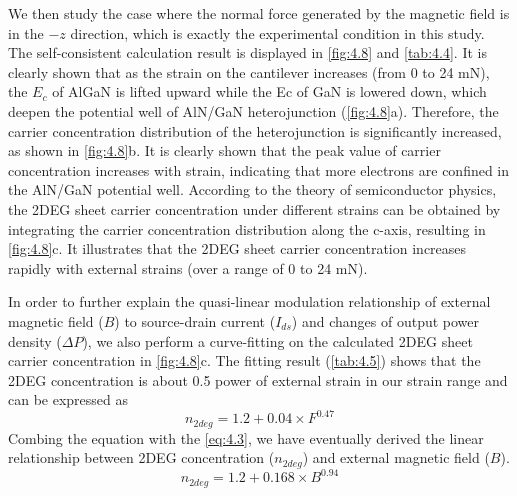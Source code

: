 We  then study the case where the normal force generated by the  magnetic field is in the $-z$ direction, which is exactly the experimental condition in this study. The self-consistent calculation result is displayed in \autoref{fig:4.8} and \autoref{tab:4.4}. It is clearly shown that as the strain on the cantilever  increases (from 0 to 24 \unit{\mN}), the $E_{c}$ of AlGaN is lifted upward while the Ec of GaN is lowered down, which deepen the  potential well of AlN/GaN heterojunction (\autoref{fig:4.8}a). Therefore, the  carrier  concentration distribution of the heterojunction is significantly increased, as shown in \autoref{fig:4.8}b. It is clearly shown that the peak value of carrier concentration increases with strain, indicating that more electrons are confined in the AlN/GaN potential well. According to the theory of semiconductor physics, the 2DEG sheet carrier concentration under different strains can be obtained by integrating the carrier concentration distribution along the c-axis, resulting in \autoref{fig:4.8}c. It illustrates that the 2DEG  sheet carrier concentration increases rapidly with external strains (over a range of 0 to 24 \unit{\mN}).

In order to further explain the quasi-linear modulation relationship of external magnetic field ($B$) to source-drain current ($I_{ds}$) and changes of output power density ($\Delta P$), we also perform a curve-fitting on the calculated 2DEG sheet carrier  concentration in \autoref{fig:4.8}c. The fitting result (\autoref{tab:4.5}) shows that the 2DEG concentration is about 0.5 power of external strain in our strain range and can be expressed as
\begin{equation}
	n_{2deg}=1.2+0.04 \times F^{0.47}
\label{eq:4.}
\end{equation}
Combing the equation with the \autoref{eq:4.3}, we have eventually derived the linear relationship between 2DEG concentration ($n_{2deg}$) and external magnetic field ($B$). 
\begin{equation}
	n_{2deg}=1.2+0.168\times B^{0.94}
\label{eq:4.6} 
\end{equation}


